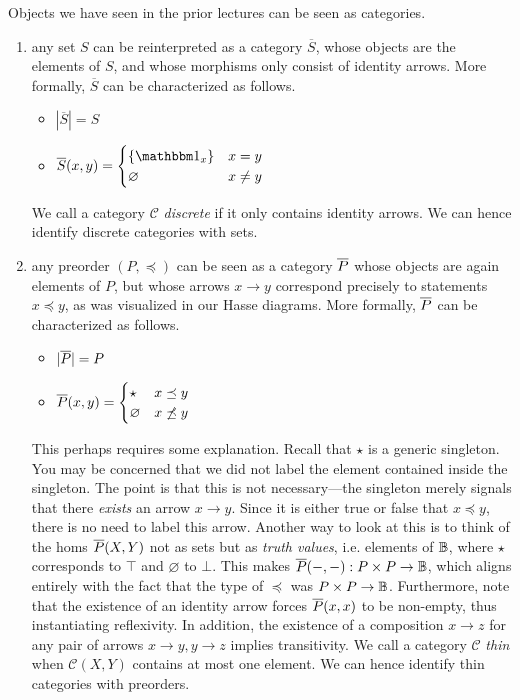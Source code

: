 \begin{ex}\label{ex:catsasobjects} Objects we have seen in the prior lectures can be seen as categories.

\begin{enumerate} 
\item any set $S$ can be reinterpreted as a category $\overline{S}$, whose objects are the elements of $S$, and whose morphisms only consist of identity arrows. More formally, $\overline{S}$ can be characterized as follows.
\begin{itemize}
\item $|\overline{S}|=S$
\item $\overline{S}(x,y) = \begin{cases}\{\Id{x}\} & x=y \\ \varnothing & x\neq y \end{cases}$
\end{itemize}
We call a category $\mathcal{C}$ \emph{discrete} if it only contains identity arrows. We can hence identify discrete categories with sets.
\item any preorder $(P,\preceq)$ can be seen as a category $\overline{P}$ whose objects are again elements of $P$, but whose arrows $x\to y$ correspond precisely to statements $x\preceq y$, as was visualized in our Hasse diagrams. More formally, $\overline{P}$ can be characterized as follows.
\begin{itemize}
\item $|\overline{P}| = P$ 
\item $\overline{P}(x,y) = \begin{cases} \star & x\preceq y \\ \varnothing & x\not\preceq y \end{cases}$

\end{itemize}
This perhaps requires some explanation. Recall that $\star$ is a generic singleton. You may be concerned that we did not label the element contained inside the singleton. The point is that this is not necessary---the singleton merely signals that there \emph{exists} an arrow $x\to y$. Since it is either true or false that $x\preceq y$, there is no need to label this arrow. Another way to look at this is to think of the homs $\overline{P}(X,Y)$ not as sets but as \emph{truth values}, i.e. elements of $\mathbb B$, where $\star$ corresponds to $\top$ and $\varnothing$ to $\bot$. This makes $\overline{P}(-,-):P\times P\to\mathbb B$, which aligns entirely with the fact that the type of $\preceq$ was $P\times P\to \mathbb B$. Furthermore, note that the existence of an identity arrow forces $\overline{P}(x,x)$ to be non-empty, thus instantiating reflexivity. In addition, the existence of a composition $x\to z$ for any pair of arrows $x\to y,y\to z$ implies transitivity. We call a category $\mathcal{C}$ \emph{thin} when $\mathcal{C}(X,Y)$ contains at most one element. We can hence identify thin categories with preorders.


\end{enumerate}
\end{ex}
